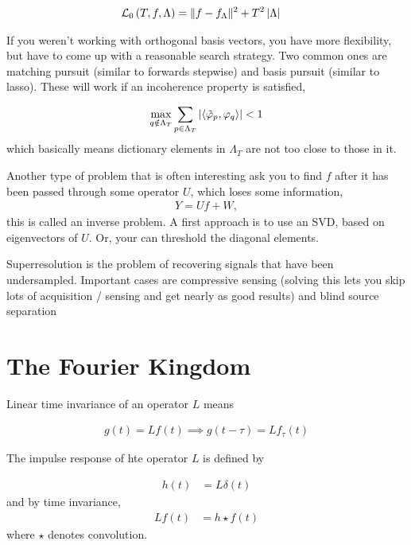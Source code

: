 \documentclass{article}
\begin{document}
\begin{align}
\mathcal{L}_{0}\left(T, f, \Lambda\right) &= \|f - f_{\Lambda}\|^{2} + T^{2}\left|\Lambda\right|
\end{align}

If you weren't working with orthogonal basis vectors, you have more flexibility,
but have to come up with a reasonable search strategy. Two common ones are
matching pursuit (similar to forwards stepwise) and basis pursuit (similar to
lasso). These will work if an incoherence property is satisfied,

\begin{align}
\max_{q \notin \Lambda_{T}} \sum_{p \in \Lambda_{T}} \left|\left<\tilde{\varphi}_p, \varphi_q\right>\right| < 1
\end{align}
which basically means dictionary elements in $\Lambda_{T}$ are not too close to
those in it.

Another type of problem that is often interesting ask you to find $f$ after it
has been passed through some operator $U$, which loses some information,
\begin{align}
Y = U f + W,
\end{align}
this is called an inverse problem. A first approach is to use an SVD, based on
eigenvectors of $U$. Or, your can threshold the diagonal elements.

Superresolution is the problem of recovering signals that have been
undersampled. Important cases are compressive sensing (solving this lets you
skip lots of acquisition / sensing and get nearly as good results) and blind
source separation

\section{The Fourier Kingdom}
\label{sec:chapter_2}

Linear time invariance of an operator $L$ means

\begin{align}
g\left(t\right) = Lf\left(t\right) \implies g\left(t - \tau\right) = L f_{\tau}\left(t\right)
\end{align}

The impulse response of hte operator $L$ is defined by

\begin{align}
h\left(t\right) &= L \delta\left(t\right)
\end{align}
and by time invariance,
\begin{align}
Lf\left(t\right) &= h\star f\left(t\right)
\end{align}
where $\star$ denotes convolution.
\end{document}
